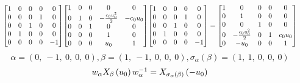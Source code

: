 \documentclass[11pt]{article}
\theoremstyle{definition}
\begin{document}
\[
\scaletoalign{\textwidth}{{\left[\begin{matrix}1 & 0 & 0 & 0 & 0\\0 & 0 & 0 & 1 & 0\\0 & 0 & 1 & 0 & 0\\0 & 1 & 0 & 0 & 0\\0 & 0 & 0 & 0 & -1\end{matrix}\right]} {\left[\begin{matrix}1 & 0 & 0 & 0 & 0\\0 & 1 & 0 & - \frac{c_{0} u_{0}^{2}}{2} & - c_{0} u_{0}\\0 & 0 & 1 & 0 & 0\\0 & 0 & 0 & 1 & 0\\0 & 0 & 0 & u_{0} & 1\end{matrix}\right]} {\left[\begin{matrix}1 & 0 & 0 & 0 & 0\\0 & 0 & 0 & 1 & 0\\0 & 0 & 1 & 0 & 0\\0 & 1 & 0 & 0 & 0\\0 & 0 & 0 & 0 & -1\end{matrix}\right]} = {\left[\begin{matrix}1 & 0 & 0 & 0 & 0\\0 & 1 & 0 & 0 & 0\\0 & 0 & 1 & 0 & 0\\0 & - \frac{c_{0} u_{0}^{2}}{2} & 0 & 1 & c_{0} u_{0}\\0 & - u_{0} & 0 & 0 & 1\end{matrix}\right]}}
\]
\[
\alpha = \left( 0, \  -1, \  0, \  0, \  0\right), \beta = \left( 1, \  -1, \  0, \  0, \  0\right), \sigma_{\alpha}(\beta) = \left( 1, \  1, \  0, \  0, \  0\right)
\]
\[
\scaletoalign{\textwidth}{w_{\alpha} X_{\beta}\left(u_{0}\right) w_{\alpha}^{-1} = X_{\sigma_{\alpha}\left(\beta\right)}\left(- u_{0}\right)}
\]
\end{document}
